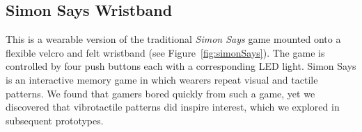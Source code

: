 \documentclass{chi-ext}
\begin{document}

\subsection{Simon Says Wristband}
This is a wearable version of the traditional \emph{Simon Says} game mounted onto a flexible velcro and felt wristband (see Figure~\ref{fig:simonSays}). The game is controlled by four push buttons each with a corresponding LED light. Simon Says is an interactive memory game in which wearers repeat visual and tactile patterns. We found that gamers bored quickly from such a game, yet we discovered that vibrotactile patterns did inspire interest, which we explored in subsequent prototypes. 



\end{document}
